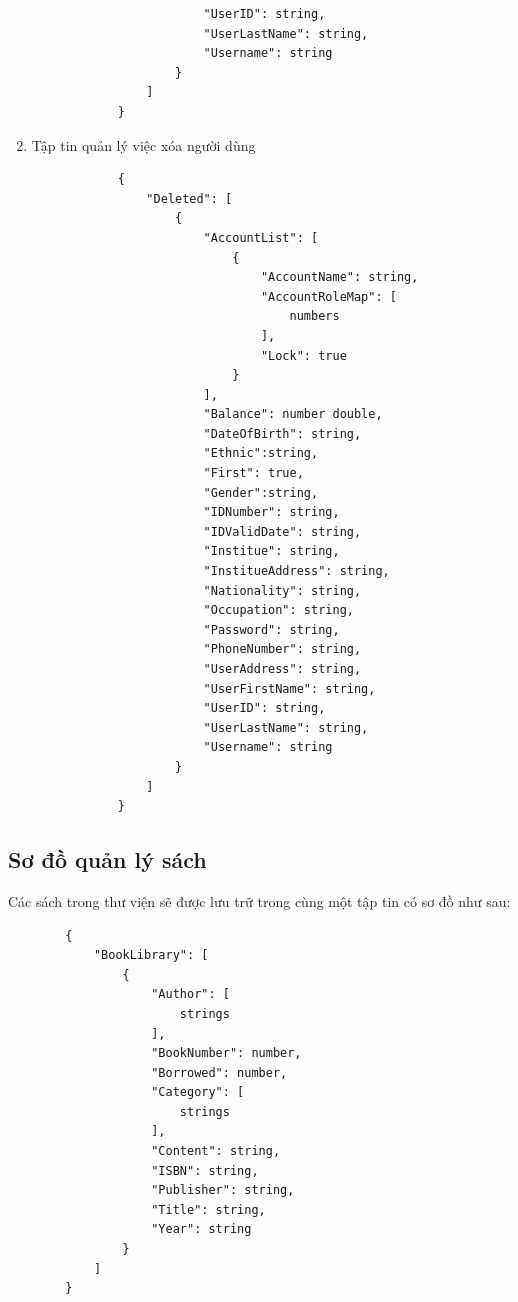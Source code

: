 \documentclass[12pt,a4paper]{report}
\begin{document}
\begin{enumerate}
\begin{verbatim}
                        "UserID": string,
                        "UserLastName": string,
                        "Username": string
                    }
                ]
            }
            \end{verbatim}
            \newpage
            \item Tập tin quản lý việc xóa người dùng
            \begin{verbatim}
            {
                "Deleted": [
                    {
                        "AccountList": [
                            {
                                "AccountName": string,
                                "AccountRoleMap": [
                                    numbers
                                ],
                                "Lock": true
                            }
                        ],
                        "Balance": number double,
                        "DateOfBirth": string,
                        "Ethnic":string,
                        "First": true,
                        "Gender":string,
                        "IDNumber": string,
                        "IDValidDate": string,
                        "Institue": string,
                        "InstitueAddress": string,
                        "Nationality": string,
                        "Occupation": string,
                        "Password": string,
                        "PhoneNumber": string,
                        "UserAddress": string,
                        "UserFirstName": string,
                        "UserID": string,
                        "UserLastName": string,
                        "Username": string
                    }
                ]
            }
            \end{verbatim}
        \end{enumerate}
        \newpage
        \subsection{Sơ đồ quản lý sách}
        Các sách trong thư viện sẽ được lưu trữ trong cùng một tập tin có sơ đồ như sau:
        \begin{verbatim}
        {
            "BookLibrary": [
                {
                    "Author": [
                        strings
                    ],
                    "BookNumber": number,
                    "Borrowed": number,
                    "Category": [
                        strings
                    ],
                    "Content": string,
                    "ISBN": string,
                    "Publisher": string,
                    "Title": string,
                    "Year": string
                }
            ]
        }
        \end{verbatim}
        \newpage
\end{document}
